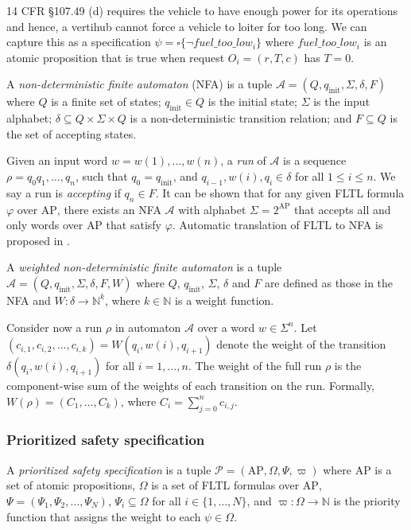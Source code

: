 \begin{eg}
 14 CFR \S 107.49 (d) requires the vehicle to have enough power for its operations and hence, a vertihub cannot force a vehicle to loiter for too long. We can capture this as a specification $\psi = \square \{\lnot fuel\_too\_low_i\} $ where $fuel\_too\_low_i$ is an atomic proposition that is true when request $O_i = (r,T,c)$ has $T = 0$.
\end{eg}



A  \emph{non-deterministic finite automaton} (NFA) is a  tuple $\mathcal A = (Q,q_{\text{init}},\Sigma,\delta,F)$ where $Q$ is a finite set of states; $q_{\text{init}} \in Q$ is the initial state; $\Sigma$ is the input alphabet; $\delta \subseteq Q \times \Sigma \times Q$ is a non-deterministic transition relation; and $F \subseteq Q$ is the set of accepting states. 

Given an input word $w = w(1),\dots,w(n)$, a \emph{run} of $\mathcal A$ is a sequence $\rho = q_0q_1,\dots,q_n$, such that $q_0 = q_{\text{init}}$, and $q_{i-1},w(i),q_i \in \delta$ for all $1 \leq i \leq n$. We say a run is \emph{accepting} if $q_n \in F$. It can be shown that for any given FLTL formula $\varphi$ over $\text{AP}$, there exists an NFA $\mathcal{A}$ with alphabet $\Sigma = 2^{\text{AP}}$ that accepts all and only words over $\text{AP}$ that satisfy $\varphi$. Automatic translation of FLTL to NFA is proposed in \cite{}.

A \emph{weighted non-deterministic finite automaton} is a tuple $\mathcal A = (Q,q_{\text{init}},\Sigma,\delta,F,W)$ where $Q$, $q_{\text{init}}$, $\Sigma$, $\delta$ and $F$ are defined as those in the NFA and $W : \delta \rightarrow \mathbb{N}^k$, where $k \in \mathbb{N}$ is a weight function.  

Consider now a run $\rho$ in automaton $\mathcal A$ over a word $w \in \Sigma^{n}$. Let $\left(c_{i,1},c_{i,2},\dots,c_{i,k}\right) = W(q_{i},w(i),q_{i+1})$ denote the weight of the transition $\delta(q_{i},w(i),q_{i+1})$ for all $i = 1,\dots,n$. The weight of the full run $\rho$ is the component-wise sum of the weights of each transition on the run. Formally, $W(\rho) = \left(C_1,\dots,C_k \right)$, where $C_i = \sum_{j=0}^n c_{i,j}$.




\subsubsection{Prioritized safety specification}
A \emph{prioritized safety specification} is a tuple
$\mathcal{P} = (\text{AP}, \Omega, \Psi, \varpi)$ where
$\text{AP}$ is a set of atomic propositions,
$\Omega$ is a set of FLTL formulas over $\text{AP}$,
$\Psi = (\Psi_1, \Psi_2, \ldots, \Psi_N)$,
$\Psi_i \subseteq \Omega$
for all $i \in \{1, \ldots, N\}$,
and
$\varpi : \Omega \to \mathbb{N}$
is the priority function that assigns the weight to each
$\psi \in \Omega$.

